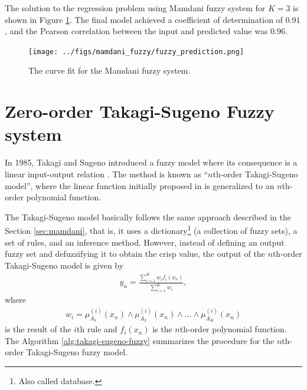 \documentclass[english]{sobraep}
\begin{document}
The solution to the regression problem using Mamdani fuzzy system for \(K=3\) is shown in Figure \ref{fig:mamdani-fuzzy-regression}. The final model achieved a coefficient of determination of \(0.91\), and the Pearson correlation between the input and predicted value was \(0.96\).

\begin{figure}[H]
    \centering
    \texttt{[image: ../figs/mamdani\_fuzzy/fuzzy\_prediction.png]}
    \caption{The curve fit for the Mamdani fuzzy system.}
    \label{fig:mamdani-fuzzy-regression}
\end{figure}

\section*{Zero-order Takagi-Sugeno Fuzzy system}

In 1985, Takagi and Sugeno introduced a fuzzy model where its consequence is a linear input-output relation \cite{takagi1985fuzzy}. The method is known as ``\(n\)th-order Takagi-Sugeno model'', where the linear function initially proposed in \cite{takagi1985fuzzy} is generalized to an \(n\)th-order polynomial function.

The Takagi-Sugeno model basically follows the same approach described in the Section \ref{sec:mamdani}\;\;\;, that is, it uses a dictionary\footnote{Also called database.} (a collection of fuzzy sets), a set of rules, and an inference method. However, instead of defining an output fuzzy set and defuzzifying it to obtain the crisp value, the output of the \(n\)th-order Takagi-Sugeno model is given by
\begin{align}
    y_n = \frac{\sum_{i=1}^{K} w_if_i(x_n)}{\sum_{i=1}^{K} w_i},
\end{align}
where
\begin{align}
    w_i = \mu_{A_1}^{(i)} (x_n) \wedge \mu_{A_2}^{(i)} (x_n) \wedge \dots \wedge \mu_{A_K}^{(i)} (x_n)
    \label{eq:w_i}
\end{align}
is the result of the \(i\)th rule and \(f_i(x_n)\) is the \(n\)th-order polynomial function. The Algorithm \ref{alg:takagi-sugeno-fuzzy} summarizes the procedure for the \(n\)th-order Takagi-Sugeno fuzzy model.
\end{document}
